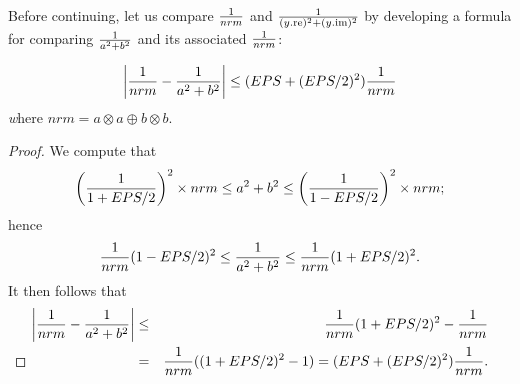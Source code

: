 Before continuing, let us compare ${1 \over nrm}$ and ${1 \over (y.\mathrm {re})^2 + (y.\mathrm {im})^2}$ by developing a formula for
comparing ${1 \over a^2 + b^2}$ and its associated ${1 \over nrm}$:
\begin{lemma}\label{GMT lemma7.2} $$\left|{1 \over nrm} - {1 \over a^2 + b^2}\right| \le   (EPS + (EPS/2)^2) {1 \over nrm}$$
{\textit where} $nrm = a\otimes a \oplus b \otimes b.$
\end{lemma}

\begin{proof}{}
We compute that 
$$\left({1 \over 1 + EPS/2}\right)^2 \times nrm
\le a^2 + b^2 
\le \left({1 \over 1 - EPS/2}\right)^2 \times nrm;$$ hence 
$${1 \over nrm} (1 - EPS/2)^2 
\le {1 \over a^2 + b^2}
\le {1 \over nrm} (1 + EPS/2)^2.$$  It then follows that 
\begin{eqnarray*}
\left|{1 \over nrm} - {1 \over a^2 + b^2}\right|& \le &
    {1 \over nrm} (1 + EPS/2)^2 - {1 \over nrm}\\
&=& {1 \over nrm} ((1 + EPS/2)^2 - 1) =
  (EPS + (EPS/2)^2){1 \over nrm} .\\
\noalign{\vskip-24pt}
\end{eqnarray*}
\end{proof}

